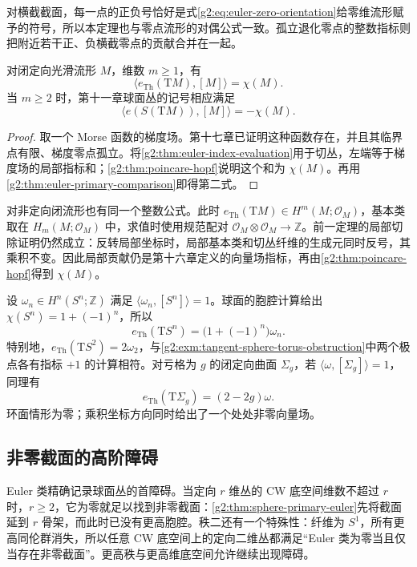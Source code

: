 对横截截面，每一点的正负号恰好是式\eqref{g2:eq:euler-zero-orientation}给零维流形赋予的符号，所以本定理也与零点流形的对偶公式一致。孤立退化零点的整数指标则把附近若干正、负横截零点的贡献合并在一起。

\begin{corollary}\label{g2:cor:tangent-euler-characteristic}
	对闭定向光滑流形 \(M\)，维数 \(m\ge1\)，有
	\begin{equation}\label{g2:eq:tangent-euler-characteristic}
		\langle e_{\mathrm{Th}}(\mathrm TM),[M]\rangle=\chi(M).
	\end{equation}
	当 \(m\ge2\) 时，第十一章球面丛的记号相应满足
	\[
		\langle e(S(\mathrm TM)),[M]\rangle=-\chi(M).
	\]
\end{corollary}
\begin{proof}
	取一个 Morse 函数的梯度场。第十七章已证明这种函数存在，并且其临界点有限、梯度零点孤立。将\cref{g2:thm:euler-index-evaluation}用于切丛，左端等于梯度场的局部指标和；\cref{g2:thm:poincare-hopf}说明这个和为 \(\chi(M)\)。再用\cref{g2:thm:euler-primary-comparison}即得第二式。
\end{proof}

对非定向闭流形也有同一个整数公式。此时 \(e_{\mathrm{Th}}(\mathrm TM)\in H^m(M;\mathcal O_M)\)，基本类取在 \(H_m(M;\mathcal O_M)\) 中，求值时使用规范配对 \(\mathcal O_M\otimes\mathcal O_M\to\mathbb Z\)。前一定理的局部切除证明仍然成立：反转局部坐标时，局部基本类和切丛纤维的生成元同时反号，其乘积不变。因此局部贡献仍是第十六章定义的向量场指标，再由\cref{g2:thm:poincare-hopf}得到 \(\chi(M)\)。

\begin{example}\label{g2:ex:euler-tangent-spheres-surfaces}
	设 \(\omega_n\in H^n(S^n;\mathbb Z)\) 满足 \(\langle\omega_n,[S^n]\rangle=1\)。球面的胞腔计算给出 \(\chi(S^n)=1+(-1)^n\)，所以
	\[
		e_{\mathrm{Th}}(\mathrm TS^n)=\bigl(1+(-1)^n\bigr)\omega_n.
	\]
	特别地，\(e_{\mathrm{Th}}(\mathrm TS^2)=2\omega_2\)，与\cref{g2:exm:tangent-sphere-torus-obstruction}中两个极点各有指标 \(+1\) 的计算相符。对亏格为 \(g\) 的闭定向曲面 \(\Sigma_g\)，若 \(\langle\omega,[\Sigma_g]\rangle=1\)，同理有
	\[
		e_{\mathrm{Th}}(\mathrm T\Sigma_g)=(2-2g)\omega.
	\]
	环面情形为零；乘积坐标方向同时给出了一个处处非零向量场。
\end{example}

\subsection{非零截面的高阶障碍}
\label{g2:subsec:2003:04}
Euler 类精确记录球面丛的首障碍。当定向 \(r\) 维丛的 CW 底空间维数不超过 \(r\) 时，\(r\ge2\)，它为零就足以找到非零截面：\cref{g2:thm:sphere-primary-euler}先将截面延到 \(r\) 骨架，而此时已没有更高胞腔。秩二还有一个特殊性：纤维为 \(S^1\)，所有更高同伦群消失，所以任意 CW 底空间上的定向二维丛都满足“Euler 类为零当且仅当存在非零截面”。更高秩与更高维底空间允许继续出现障碍。

